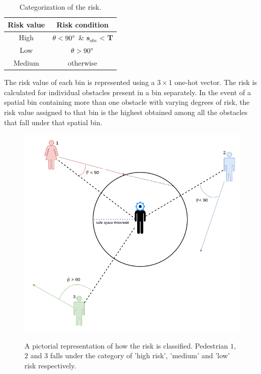 \begin{table}[htbp]
    \caption{Categorization of the risk.}
    \label{risk-categorization-table}
    \begin{center}
        \renewcommand{\arraystretch}{1.3}
        \begin{tabular}{|c|c|}
            \hline
            Risk value & Risk condition \\
            \hline
            High & $\theta < 90\degree$ \&  $\mathbf{s}_{obs}$ < $\mathbf{T}$   \\
            
            Low & $\theta > 90\degree$\\
            
            Medium & otherwise \\
            \hline
        \end{tabular}
    \end{center}
\end{table}
The risk value of each bin is represented using a $3 \times 1$ one-hot vector. The risk is calculated for individual obstacles present in a bin separately. In the event of a spatial bin containing more than one obstacle with varying degrees of risk, the risk value assigned to that bin is the highest obtained among all the obstacles that fall under that spatial bin.
\begin{figure}[!htbp]
	\centering
	\includegraphics[width=.8\linewidth]{figures/risk_picture.png}
    \label{fig:risk-calculation}
    \caption{A pictorial representation of how the risk is classified. Pedestrian $1$, $2$ and $3$ falls under the category of 'high risk', 'medium' and 'low' risk respectively.}
\end{figure}


